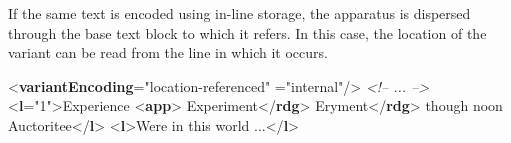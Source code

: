 If the same text is encoded using in-line storage, the apparatus is dispersed through the base text block to which it refers. In this case, the location of the variant can be read from the line in which it occurs. \par\bgroup{}\exampleFont \begin{shaded}\noindent\mbox{}{<\textbf{variantEncoding}\hspace*{1em}{method}="{location-referenced}"\mbox{}\newline 
\hspace*{1em}{location}="{internal}"/>}\mbox{}\newline 
\textit{<!-- ... -->}\mbox{}\newline 
{<\textbf{l}\hspace*{1em}{n}="{1}">}Experience\mbox{}\newline 
{<\textbf{app}>}\mbox{}\newline 
\hspace*{1em}Experiment{</\textbf{rdg}>}\mbox{}\newline 
\hspace*{1em}Eryment{</\textbf{rdg}>}\mbox{}\newline 
{}\mbox{}\newline 
 though noon Auctoritee{</\textbf{l}>}\mbox{}\newline 
{<\textbf{l}>}Were in this world ...{</\textbf{l}>}\end{shaded}\egroup\par \par
